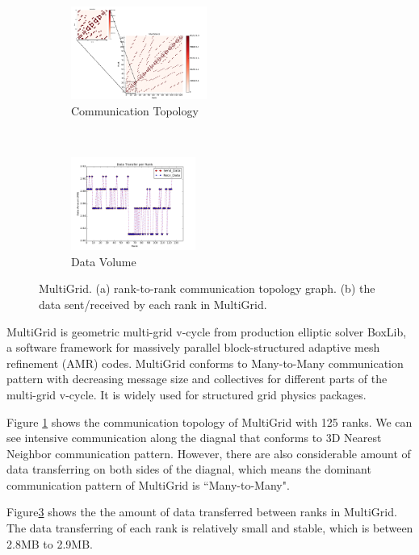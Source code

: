 \documentclass[conference]{IEEEtran}
\begin{document}
\begin{figure}[t!]
    \centering
    \begin{subfigure}[t]{0.22\textwidth}
        \centering
        \includegraphics[height=1.2in]{figs/appstudy/mg/mg_pip}
        \caption{Communication Topology}
        \label{fig: mg communication topology}
    \end{subfigure}
    ~
    \begin{subfigure}[t]{0.22\textwidth}
        \centering
        \includegraphics[height=1.2in]{figs/appstudy/mg/mg_data_transfer}
        \caption{Data Volume}
        \label{fig: mg data trans}
    \end{subfigure}
    \caption{MultiGrid. (a) rank-to-rank communication topology graph. (b) the data sent/received by each rank in MultiGrid.}
\end{figure}

MultiGrid is geometric multi-grid v-cycle from production elliptic solver BoxLib, a software framework for massively parallel block-structured adaptive mesh refinement (AMR) codes. MultiGrid conforms to Many-to-Many communication pattern with decreasing message size and collectives for different parts of the multi-grid v-cycle. It is widely used for structured grid physics packages. 

Figure \ref{fig: mg communication topology} shows the communication topology of MultiGrid with 125 ranks. We can see intensive communication along the diagnal that conforms to 3D Nearest Neighbor communication pattern. However, there are also considerable amount of data transferring on both sides of the diagnal, which means the dominant communication pattern of MultiGrid is ``Many-to-Many".

Figure\ref{fig: mg data trans} shows the the amount of data transferred between ranks in MultiGrid. The data transferring of each rank is relatively small and stable, which is between 2.8MB to 2.9MB. 
\end{document}
